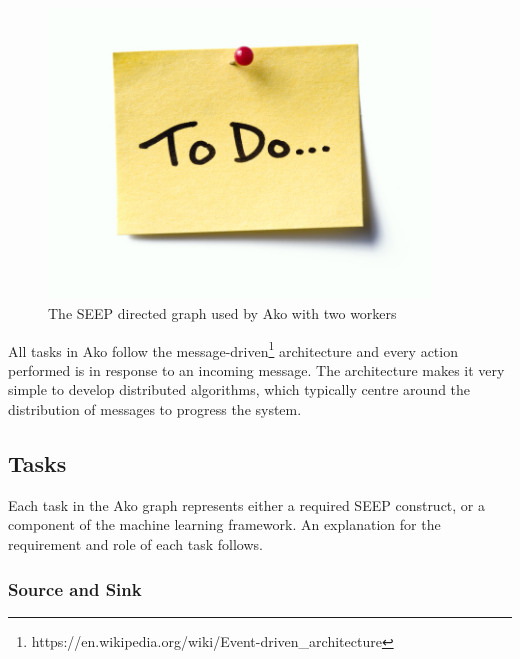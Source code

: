 \documentclass[12pt]{article}
\begin{document}
\begin{figure}[H]
  \centering
  \includegraphics[width=4in]{todo}
  \caption[]{The SEEP directed graph used by Ako with two workers}
  \label{SEEPStreamIDs}
\end{figure}

All tasks in Ako follow the message-driven\footnote{https://en.wikipedia.org/wiki/Event-driven\_architecture} architecture and every action performed is in response to an incoming message. The architecture makes it very simple to develop distributed algorithms, which typically centre around the distribution of messages to progress the system.

\subsection{Tasks}

Each task in the Ako graph represents either a required SEEP construct, or a component of the machine learning framework. An explanation for the requirement and role of each task follows. 

\subsubsection{Source and Sink}
\end{document}
